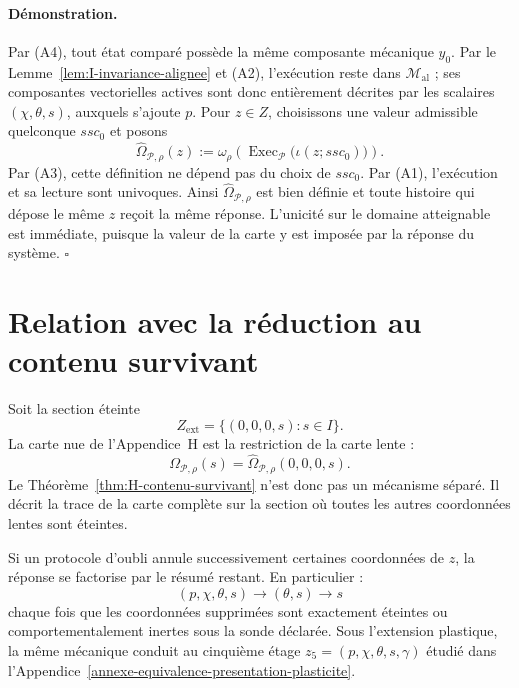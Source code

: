 \paragraph{Démonstration.}
Par (A4), tout état comparé possède la même composante mécanique $y_0$.
Par le Lemme~\ref{lem:I-invariance-alignee} et (A2), l'exécution reste dans
$\mathcal M_{\mathrm{al}}$ ; ses composantes vectorielles actives sont
donc entièrement décrites par les scalaires $(\chi,\theta,s)$, auxquels
s'ajoute $p$. Pour $z\in Z$, choisissons une valeur admissible quelconque
$ssc_0$ et posons
\begin{equation}
\label{eq:annexe-I-definition-Omega}
\widehat\Omega_{\mathcal P,\rho}(z)
:=
\omega_\rho\!\left(
\operatorname{Exec}_{\mathcal P}
\bigl(\iota(z;ssc_0)\bigr)
\right).
\end{equation}
Par (A3), cette définition ne dépend pas du choix de $ssc_0$. Par (A1),
l'exécution et sa lecture sont univoques. Ainsi
$\widehat\Omega_{\mathcal P,\rho}$ est bien définie et toute histoire
qui dépose le même $z$ reçoit la même réponse. L'unicité sur le domaine
atteignable est immédiate, puisque la valeur de la carte y est imposée
par la réponse du système. \hfill$\square$

\section{Relation avec la réduction au contenu survivant}
\label{annexe-I-relation-H}

Soit la section éteinte
\[
Z_{\mathrm{ext}}
=
\{(0,0,0,s):s\in I\}.
\]
La carte nue de l'Appendice~H est la restriction de la carte lente :
\begin{equation}
\label{eq:annexe-I-restriction-H}
\boxed{
\Omega_{\mathcal P,\rho}(s)
=
\widehat\Omega_{\mathcal P,\rho}(0,0,0,s).
}
\end{equation}
Le Théorème~\ref{thm:H-contenu-survivant} n'est donc pas un mécanisme séparé. Il décrit la trace
de la carte complète sur la section où toutes les autres coordonnées
lentes sont éteintes.

\begin{encadre}[title={Corollaire \theproposition{} --- Emboîtement des résumés suffisants}]
Si un protocole d'oubli annule successivement certaines coordonnées de
$z$, la réponse se factorise par le résumé restant. En particulier :
\[
(p,\chi,\theta,s)
\longrightarrow
(\theta,s)
\longrightarrow
s
\]
chaque fois que les coordonnées supprimées sont exactement éteintes ou
comportementalement inertes sous la sonde déclarée. Sous l'extension
plastique, la même mécanique conduit au cinquième étage
$z_5=(p,\chi,\theta,s,\gamma)$ étudié dans l'Appendice~\ref{annexe-equivalence-presentation-plasticite}.
\end{encadre}

